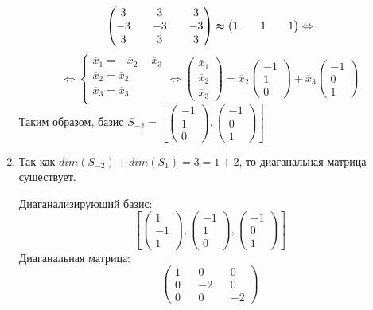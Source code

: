 \documentclass[a4paper]{article}
\begin{document}
\begin{enumerate}
			$$\begin{pmatrix} 3 && 3 && 3 \\ -3 && -3 && -3 \\ 3 && 3 && 3\end{pmatrix}\thickapprox\begin{pmatrix} 1 && 1 && 1 \end{pmatrix}\Leftrightarrow$$
			$$\Leftrightarrow\begin{cases}
				\overline{x}_1 = -\overline{x}_2 - \overline{x}_3\\
				\overline{x}_2 = \overline{x}_2\\
				\overline{x}_3 = \overline{x}_3\\
			\end{cases}\Leftrightarrow
			\begin{pmatrix} \overline{x}_1 \\ \overline{x}_2 \\ \overline{x}_3 \end{pmatrix}=
			\overline{x}_2\begin{pmatrix} -1 \\ 1 \\ 0 \end{pmatrix} + \overline{x}_3\begin{pmatrix} -1 \\ 0 \\ 1 \end{pmatrix}$$
			Таким образом, базис $S_{-2}=[\begin{pmatrix} -1 \\ 1 \\ 0 \end{pmatrix}, \begin{pmatrix} -1 \\ 0 \\ 1 \end{pmatrix}]$
		\item Так как $dim(S_{-2})+dim(S_{1})=3=1+2$, то диаганальная матрица существует.
		\par
		Диаганализирующий базис:
		$$[\begin{pmatrix} 1 \\ -1 \\ 1 \end{pmatrix}, \begin{pmatrix} -1 \\ 1 \\ 0 \end{pmatrix}, \begin{pmatrix} -1 \\ 0 \\ 1 \end{pmatrix}]$$
		Диаганальная матрица:
		$$\begin{pmatrix} 1 && 0 && 0 \\ 0 && -2 && 0 \\ 0 && 0 && -2\end{pmatrix}$$
	\end{enumerate}
\end{document}
